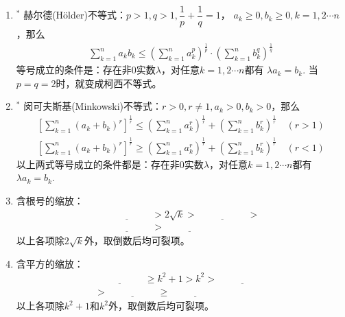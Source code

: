 \documentclass{article}
\newif\ifte
\renewcommand\leq\leqslant
\renewcommand\geq\geqslant
\begin{document}
\begin{multicols}{2}
\begin{enumerate}[leftmargin=20pt]
\item $^*$ 赫尔德(Hölder)不等式：$ p>1,q>1,\dfrac{1}{p}+\dfrac{1}{q}=1 $，
$ a_k\geq 0,b_k\geq 0,k=1,2\cdots n $，那么
\begin{gather*}
    \sum_{k=1}^{n}a_kb_k\leq \left(\sum_{k=1}^{n}a_k^p\right)^{\frac{1}{p}}
    \cdot\left(\sum_{k=1}^{n}b_k^q\right)^{\frac{1}{q}}
\end{gather*}
等号成立的条件是：存在非0实数$ \lambda $，对任意$ k=1,2\cdots n $都有
$ \lambda a_k=b_k $. 当$ p=q=2 $时，就变成柯西不等式。

\item $^*$ 闵可夫斯基(Minkowski)不等式：$ r>0,r\neq 1,a_k>0,b_k>0 $，那么
\begin{align*}
    \left[\sum_{k=1}^{n}(a_k+b_k)^r\right]^{\frac{1}{r}}\leq
    \left(\sum_{k=1}^{n}a_k^r\right)^{\frac{1}{r}}+
    \left(\sum_{k=1}^{n}b_k^r\right)^{\frac{1}{r}} \quad(r>1) \\
    \left[\sum_{k=1}^{n}(a_k+b_k)^r\right]^{\frac{1}{r}}\geq
    \left(\sum_{k=1}^{n}a_k^r\right)^{\frac{1}{r}}+
    \left(\sum_{k=1}^{n}b_k^r\right)^{\frac{1}{r}} \quad(r<1)
\end{align*}
以上两式等号成立的条件都是：存在非0实数$ \lambda $，对任意$ k=1,2\cdots n $都有
$ \lambda a_k=b_k $. 

\item 含根号的缩放：
\begin{gather*}
    \underline{\ \ifte \sqrt{k+1}+\sqrt{k}\else \hspace{2cm} \fi\ }
    >2\sqrt{k}>\underline{\ \ifte \sqrt{k+\dfrac{1}{2}}+
    \sqrt{k-\dfrac{1}{2}} \else \hspace{2cm} \fi\ }> \\
    \underline{\ \ifte \sqrt{k+1}+\sqrt{k-1}\else \hspace{2cm} \fi\ }
    >\underline{\ \ifte \sqrt{k}+\sqrt{k-1}\else \hspace{2cm} \fi\ }
\end{gather*}
以上各项除$ 2\sqrt{k} $外，取倒数后均可裂项。

\item 含平方的缩放：
\begin{gather*}
    \underline{\ \ifte k(k+1)\else \hspace{2cm} \fi\ }\geq k^2+1>k^2>
    \underline{\ \ifte \left( k-\dfrac{1}{2}\right)\left(k+
    \dfrac{1}{2}\right)\else \hspace{2cm} \fi\ } \\
    >\underline{\ \ifte (k-1)(k+1)\else \hspace{2cm} \fi\ } \geq
    \underline{\ \ifte k(k-1)\else \hspace{2cm} \fi\ }
\end{gather*}
以上各项除$ k^2+1 $和$ k^2 $外，取倒数后均可裂项。


\end{enumerate}
\end{multicols}
\end{document}

